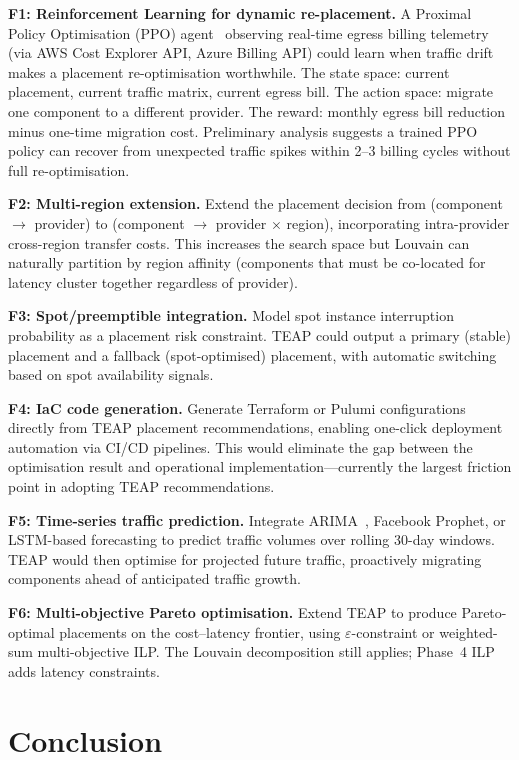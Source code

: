 \documentclass[10pt,journal]{IEEEtran}
\begin{document}
\textbf{F1: Reinforcement Learning for dynamic re-placement.}
A Proximal Policy Optimisation (PPO) agent~\cite{schulman2017} observing
real-time egress billing telemetry (via AWS Cost Explorer API, Azure Billing API)
could learn when traffic drift makes a placement re-optimisation worthwhile.
The state space: current placement, current traffic matrix, current egress bill.
The action space: migrate one component to a different provider.
The reward: monthly egress bill reduction minus one-time migration cost.
Preliminary analysis suggests a trained PPO policy can recover from
unexpected traffic spikes within 2--3 billing cycles without full re-optimisation.

\textbf{F2: Multi-region extension.}
Extend the placement decision from (component $\to$ provider) to
(component $\to$ provider $\times$ region), incorporating intra-provider
cross-region transfer costs.
This increases the search space but Louvain can naturally partition by
region affinity (components that must be co-located for latency
cluster together regardless of provider).

\textbf{F3: Spot/preemptible integration.}
Model spot instance interruption probability as a placement risk constraint.
TEAP could output a primary (stable) placement and a fallback (spot-optimised)
placement, with automatic switching based on spot availability signals.

\textbf{F4: IaC code generation.}
Generate Terraform or Pulumi configurations directly from TEAP placement
recommendations, enabling one-click deployment automation via CI/CD pipelines.
This would eliminate the gap between the optimisation result and operational
implementation---currently the largest friction point in adopting TEAP recommendations.

\textbf{F5: Time-series traffic prediction.}
Integrate ARIMA~\cite{box2015}, Facebook Prophet, or LSTM-based forecasting
to predict traffic volumes over rolling 30-day windows.
TEAP would then optimise for projected future traffic, proactively migrating
components ahead of anticipated traffic growth.

\textbf{F6: Multi-objective Pareto optimisation.}
Extend TEAP to produce Pareto-optimal placements on the cost--latency
frontier, using $\varepsilon$-constraint or weighted-sum multi-objective ILP.
The Louvain decomposition still applies; Phase~4 ILP adds latency constraints.

\section{Conclusion}\label{sec:conc}
\end{document}
